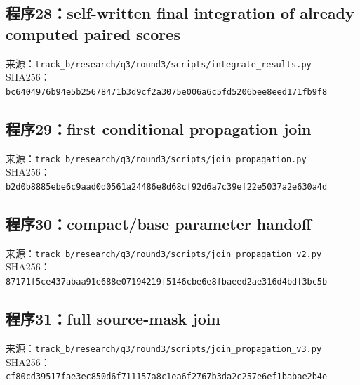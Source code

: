 \subsection*{程序28：self-written final integration of already computed paired scores}
\noindent 来源：\nolinkurl{track_b/research/q3/round3/scripts/integrate_results.py}\\
\noindent SHA256：\texttt{bc6404976b94e5b25678471b3d9cf2a3}\allowbreak\texttt{075e006a6c5fd5206bee8eed171fb9f8}\\
\clearpage
\subsection*{程序29：first conditional propagation join}
\noindent 来源：\nolinkurl{track_b/research/q3/round3/scripts/join_propagation.py}\\
\noindent SHA256：\texttt{b2d0b8885ebe6c9aad0d0561a24486e8}\allowbreak\texttt{d68cf92d6a7c39ef22e5037a2e630a4d}\\
\clearpage
\subsection*{程序30：compact/base parameter handoff}
\noindent 来源：\nolinkurl{track_b/research/q3/round3/scripts/join_propagation_v2.py}\\
\noindent SHA256：\texttt{87171f5ce437abaa91e688e07194219f}\allowbreak\texttt{5146cbe6e8fbaeed2ae316d4bdf3bc5b}\\
\clearpage
\subsection*{程序31：full source-mask join}
\noindent 来源：\nolinkurl{track_b/research/q3/round3/scripts/join_propagation_v3.py}\\
\noindent SHA256：\texttt{cf80cd39517fae3ec850d6f711157a8c}\allowbreak\texttt{1ea6f2767b3da2c257e6ef1babae2b4e}\\
\clearpage
